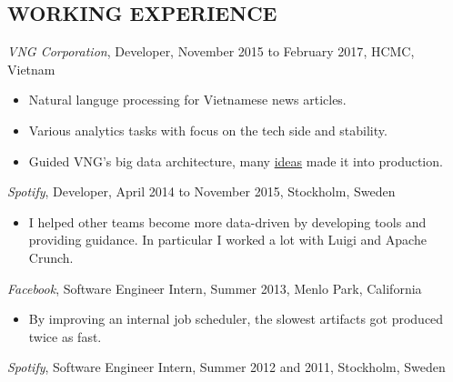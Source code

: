 \documentclass[11pt]{res} %
\begin{document}
\begin{resume}
\section{WORKING EXPERIENCE}
\emph{VNG Corporation}, {\footnotesize Developer, November 2015 to February 2017}, HCMC, Vietnam
\vspace{0.2in}
   \begin{itemize}
     \item Natural languge processing for Vietnamese news articles.
     \item Various analytics tasks with focus on the tech side and stability.
     \item Guided VNG's big data architecture, many \href{http://luigi.readthedocs.io/en/stable/luigi_patterns.html#atomic-writes-problem}{ideas} made it into production.
 \end{itemize}

\emph{Spotify}, {\footnotesize Developer, April 2014 to November 2015}, Stockholm, Sweden
\vspace{0.2in}
   \begin{itemize}
     \item I helped other teams become more data-driven by developing tools and
     providing guidance.  In particular I worked a lot with Luigi and Apache
     Crunch.
 \end{itemize}

 \emph{Facebook}, {\footnotesize Software Engineer Intern, Summer 2013}, Menlo Park, California
\vspace{0.2in}
   \begin{itemize}
   \item By improving an internal job scheduler, the slowest artifacts got produced twice as fast.
 \end{itemize}

 \emph{Spotify}, {\footnotesize Software Engineer Intern, Summer 2012 and 2011}, Stockholm, Sweden



\end{resume}
\end{document}
